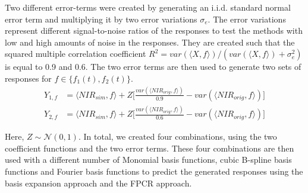 \documentclass[11pt,twoside,a4paper]{article}
\begin{document}
		 Two different error-terms were created by generating an i.i.d. standard normal error term and multiplying it by two error variations $\sigma_e $. The error variations represent different signal-to-noise ratios of the responses to test the methods with low and high amounts of noise in the responses. They are created such that the squared multiple correlation coefficient $R^2 = var(\langle X, f\rangle) / (var(\langle X, f\rangle) + \sigma^2_{e})$ is equal to 0.9 and 0.6. The two error terms are then used to generate two sets of responses for $f \in \{f_1(t), f_2(t)\}$.	
		\begin{equation}
			\begin{split}
				Y_{1,f} & = \langle NIR_{sim}, f\rangle + Z  \biggl\lbrack\frac{var(\langle NIR_{orig}, f\rangle)}{0.9} - var(\langle NIR_{orig}, f\rangle)\biggr\rbrack \\
				Y_{2,f} & = \langle NIR_{sim}, f\rangle + Z  \biggl\lbrack\frac{var(\langle NIR_{orig}, f\rangle)}{0.6} - var(\langle NIR_{orig}, f\rangle)\biggr\rbrack
			\end{split}
		\end{equation}
		
		Here, $Z \sim \mathcal{N}(0,1)$. In total, we created four combinations, using the two coefficient functions and the two error terms. These four combinations are then used with a different number of Monomial basis functions, cubic B-spline basis functions and Fourier basis functions to predict the generated responses using the basis expansion approach and the FPCR approach.\\
\end{document}

